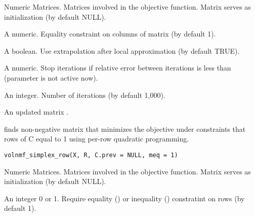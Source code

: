\documentclass[letterpaper]{book}
\begin{document}
%
\begin{Arguments}
\begin{ldescription}
\item[\code{X, R, C.prev}] Numeric Matrices. Matrices involved in the objective function.
Matrix  serves as initialization (by default NULL).

\item[\code{bound}] A numeric. Equality constraint on columns of matrix  (by default 1).

\item[\code{extrapolate}] A boolean. Use extrapolation after local approximation (by default TRUE).

\item[\code{err.cut}] A numeric. Stop iterations if relative error between iterations is less than  (parameter is not active now).

\item[\code{n.iter}] An integer. Number of iterations (by default 1,000).
\end{ldescription}
\end{Arguments}
%
\begin{Value}
An updated matrix .
\end{Value}
%
\begin{Description}\relax
{} finds non-negative matrix  that minimizes the objective 
under constraints that rows of C equal to 1 using per-row quadratic programming.
\end{Description}
%
\begin{Usage}
\begin{verbatim}
volnmf_simplex_row(X, R, C.prev = NULL, meq = 1)
\end{verbatim}
\end{Usage}
%
\begin{Arguments}
\begin{ldescription}
\item[\code{X, R, C.prev}] Numeric Matrices. Matrices involved in the objective function.
Matrix  serves as initialization (by default NULL).

\item[\code{meq}] An integer 0 or 1. Require equality () or inequality () constratint on rows (by default 1).
\end{ldescription}
\end{Arguments}
\end{document}
